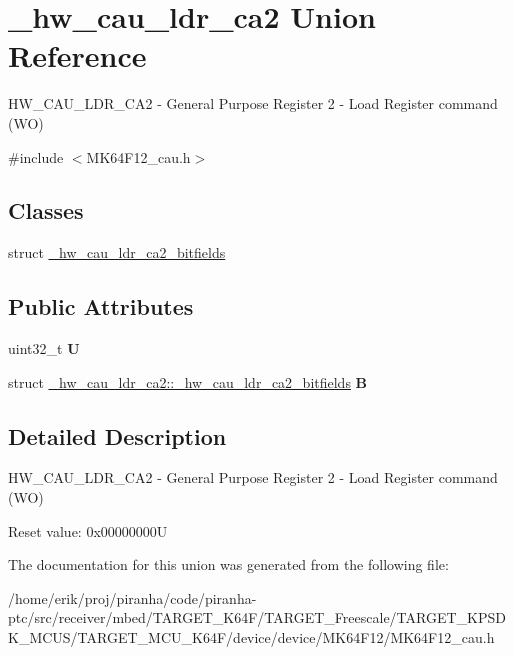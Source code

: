 \hypertarget{union__hw__cau__ldr__ca2}{}\section{\+\_\+hw\+\_\+cau\+\_\+ldr\+\_\+ca2 Union Reference}
\label{union__hw__cau__ldr__ca2}


H\+W\+\_\+\+C\+A\+U\+\_\+\+L\+D\+R\+\_\+\+C\+A2 -\/ General Purpose Register 2 -\/ Load Register command (WO)  




{\ttfamily \#include $<$M\+K64\+F12\+\_\+cau.\+h$>$}

\subsection*{Classes}
\begin{DoxyCompactItemize}
\item 
struct \hyperlink{struct__hw__cau__ldr__ca2_1_1__hw__cau__ldr__ca2__bitfields}{\+\_\+hw\+\_\+cau\+\_\+ldr\+\_\+ca2\+\_\+bitfields}
\end{DoxyCompactItemize}
\subsection*{Public Attributes}
\begin{DoxyCompactItemize}
\item 
uint32\+\_\+t {\bfseries U}\hypertarget{union__hw__cau__ldr__ca2_acbac0db4025200d925f5327a06c28220}{}\label{union__hw__cau__ldr__ca2_acbac0db4025200d925f5327a06c28220}

\item 
struct \hyperlink{struct__hw__cau__ldr__ca2_1_1__hw__cau__ldr__ca2__bitfields}{\+\_\+hw\+\_\+cau\+\_\+ldr\+\_\+ca2\+::\+\_\+hw\+\_\+cau\+\_\+ldr\+\_\+ca2\+\_\+bitfields} {\bfseries B}\hypertarget{union__hw__cau__ldr__ca2_a60cac4d250436a323fda4756a3bf282c}{}\label{union__hw__cau__ldr__ca2_a60cac4d250436a323fda4756a3bf282c}

\end{DoxyCompactItemize}


\subsection{Detailed Description}
H\+W\+\_\+\+C\+A\+U\+\_\+\+L\+D\+R\+\_\+\+C\+A2 -\/ General Purpose Register 2 -\/ Load Register command (WO) 

Reset value\+: 0x00000000U 

The documentation for this union was generated from the following file\+:\begin{DoxyCompactItemize}
\item 
/home/erik/proj/piranha/code/piranha-\/ptc/src/receiver/mbed/\+T\+A\+R\+G\+E\+T\+\_\+\+K64\+F/\+T\+A\+R\+G\+E\+T\+\_\+\+Freescale/\+T\+A\+R\+G\+E\+T\+\_\+\+K\+P\+S\+D\+K\+\_\+\+M\+C\+U\+S/\+T\+A\+R\+G\+E\+T\+\_\+\+M\+C\+U\+\_\+\+K64\+F/device/device/\+M\+K64\+F12/M\+K64\+F12\+\_\+cau.\+h\end{DoxyCompactItemize}
